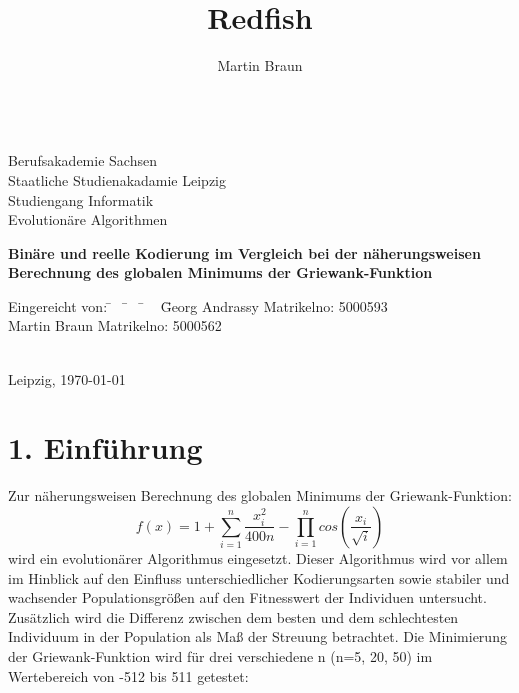 \documentclass[12pt,
    a4paper,
    headinclude,
    footinclude]{scrreprt}
\author{Martin Braun}
\title{Redfish}
\begin{document}
	\onehalfspacing
	\monthyearsepgerman{\,}{\,}
	\setcounter{tocdepth}{2}
	

	
	\begin{titlepage}
	
		\begin{center}
			~\\[2cm]
			Berufsakademie Sachsen \\
			Staatliche Studienakadamie Leipzig \\
			Studiengang Informatik \\
           	Evolutionäre Algorithmen\\ [2.4cm]
           
			\begin{Large}
			    \textbf{Binäre und reelle Kodierung im Vergleich bei der näherungsweisen Berechnung des globalen Minimums der Griewank-Funktion} \\[2.4cm]
			\end{Large}
			
			\doublespacing


		\end{center}
		\onehalfspacing
		\begin{tabbing}
			Eingereicht von: \= ~ \= ~ \= ~ \= Georg Andrassy \hspace*{3cm} Matrikelno: 5000593  \\
			\> \> \> \> Martin Braun \hspace*{3.4cm} Matrikelno: 5000562 \\
			\\

		\end{tabbing}
		\vspace*{\fill}
		Leipzig, \today
		
	\end{titlepage}
    
    \clearpage
        
    \setcounter{page}{2}
    
\section*{1. Einführung}	\onehalfspacing

Zur näherungsweisen Berechnung des globalen Minimums der Griewank-Funktion: \[f(x) = 1 +  \sum_{i=1}^n \frac{x_i^{2}}{400n} -  \prod \limits_{i=1}^n cos \left(\frac{x_i}{\sqrt{i}}\right)\] wird ein evolutionärer Algorithmus eingesetzt. Dieser Algorithmus wird vor allem im Hinblick auf den Einfluss  unterschiedlicher Kodierungsarten sowie stabiler und wachsender Populationsgrößen auf den Fitnesswert der Individuen untersucht. Zusätzlich wird die Differenz zwischen dem besten und dem schlechtesten Individuum in der Population als Maß der Streuung betrachtet. Die Minimierung der Griewank-Funktion wird für drei verschiedene n (n=5, 20, 50) im Wertebereich von -512 bis 511 getestet:
\end{document}
